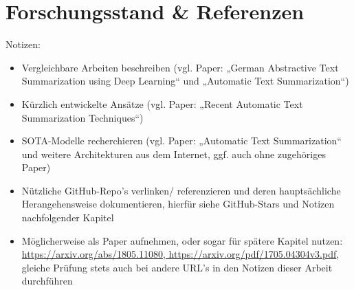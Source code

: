 \section{Forschungsstand \& Referenzen}
Notizen:
\begin{itemize}
	\item Vergleichbare Arbeiten beschreiben (vgl. Paper: „German Abstractive Text Summarization using Deep Learning“ und „Automatic Text Summarization“)
	\item Kürzlich entwickelte Ansätze (vgl. Paper: „Recent Automatic Text Summarization Techniques“)
	\item SOTA-Modelle recherchieren (vgl. Paper: „Automatic Text Summarization“ und weitere Architekturen aus dem Internet, ggf. auch ohne zugehöriges Paper)
	\item Nützliche GitHub-Repo's verlinken/ referenzieren und deren hauptsächliche Herangehensweise dokumentieren, hierfür siehe GitHub-Stars und Notizen nachfolgender Kapitel
	\item Möglicherweise als Paper aufnehmen, oder sogar für spätere Kapitel nutzen: \url{https://arxiv.org/abs/1805.11080, https://arxiv.org/pdf/1705.04304v3.pdf}, gleiche Prüfung stets auch bei andere URL's in den Notizen dieser Arbeit durchführen
\end{itemize}
